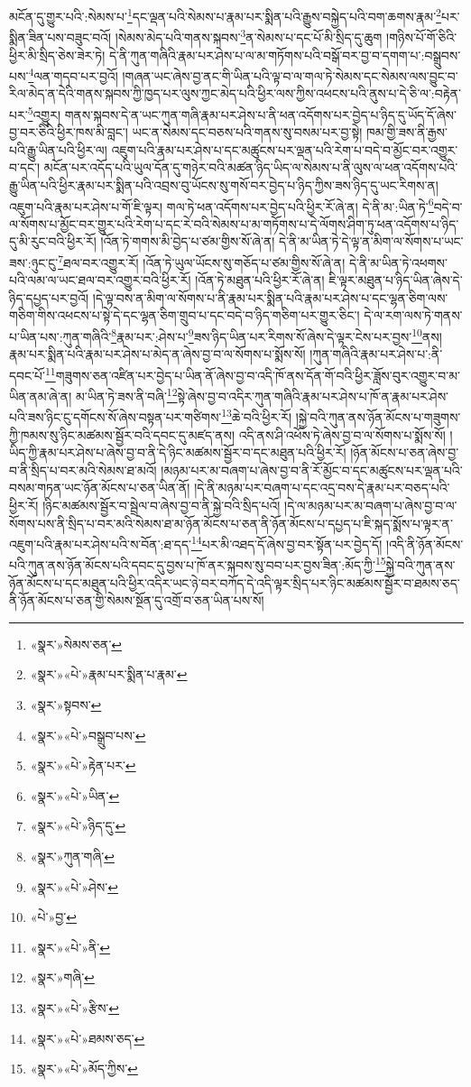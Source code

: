 མངོན་དུ་གྱུར་པའི་:སེམས་པ་\footnote{«སྣར་»སེམས་ཅན་}དང་ལྡན་པའི་སེམས་པ་རྣམ་པར་སྨིན་པའི་རྒྱུས་བསྐྱེད་པའི་བག་ཆགས་རྣམ་\footnote{«སྣར་»«པེ་»རྣམ་པར་སྨིན་པ་རྣམ་}པར་སྨིན་ཟིན་པས་བཟུང་བའོ། །སེམས་མེད་པའི་གནས་སྐབས་\footnote{«སྣར་»སྟབས་}ན་སེམས་པ་དང་པོ་མི་སྲིད་དུ་ཆུག །གཉིས་པོ་གོ་ཅིའི་ཕྱིར་མི་སྲིད་ཅེས་ཟེར་ཏེ། དེ་ནི་ཀུན་གཞིའི་རྣམ་པར་ཤེས་པ་ལ་མ་གཏོགས་པའི་བསྒོ་བར་བྱ་བ་དགག་པ་:བསྒྲུབས་པས་\footnote{«སྣར་»«པེ་»བསྒྲུབ་པས་}ལན་གདབ་པར་བྱའོ། །གཞན་ཡང་ཞེས་བྱ་ནང་གི་ཡིན་པའི་ལྟ་བ་ལ་གལ་ཏེ་སེམས་དང་སེམས་ལས་བྱུང་བ་རིལ་མེད་ན་དེའི་གནས་སྐབས་ཀྱི་ཁྱད་པར་ལུས་ཀྱང་མེད་པའི་ཕྱིར་ལས་ཀྱིས་འཕངས་པའི་ནུས་པ་དེ་ཅི་ལ་:བརྟེན་པར་\footnote{«སྣར་»«པེ་»རྟེན་པར་}འགྱུར། གནས་སྐབས་དེ་ན་ཡང་ཀུན་གཞི་རྣམ་པར་ཤེས་པ་ནི་ཕན་འདོགས་པར་བྱེད་པ་ཉིད་དུ་ཡོད་དོ་ཞེས་བྱ་བར་ཅིའི་ཕྱིར་ཁས་མི་བླང་། ཡང་ན་སེམས་དང་བཅས་པའི་གནས་སུ་བསམ་པར་བྱ་སྟེ། ཁམ་གྱི་ཟས་ནི་རྒྱས་པའི་རྒྱུ་ཡིན་པའི་ཕྱིར་ལ། འཇུག་པའི་རྣམ་པར་ཤེས་པ་དང་མཚུངས་པར་ལྡན་པའི་རེག་པ་བདེ་བ་མྱོང་བར་འགྱུར་བ་དང་། མངོན་པར་འདོད་པའི་ཡུལ་དོན་དུ་གཉེར་བའི་མཚན་ཉིད་ཡིད་ལ་སེམས་པ་ནི་ལུས་ལ་ཕན་འདོགས་པའི་རྒྱུ་ཡིན་པའི་ཕྱིར་རྣམ་པར་སྨིན་པའི་འབྲས་བུ་ཡོངས་སུ་གསོ་བར་བྱེད་པ་ཉིད་ཀྱིས་ཟས་ཉིད་དུ་ཡང་རིགས་ན། འཇུག་པའི་རྣམ་པར་ཤེས་པ་གོ་ཇི་ལྟར། གལ་ཏེ་ཕན་འདོགས་པར་བྱེད་པའི་ཕྱིར་རོ་ཞེ་ན། དེ་ནི་མ་:ཡིན་ཏེ་\footnote{«སྣར་»«པེ་»ཡིན་}བདེ་བ་ལ་སོགས་པ་མྱོང་བར་གྱུར་པའི་རེག་པ་དང་རེ་བའི་སེམས་པ་མ་གཏོགས་པ་དེ་ལོགས་ཤིག་ཏུ་ཕན་འདོགས་པ་ཉིད་དུ་མི་རུང་བའི་ཕྱིར་རོ། །འོན་ཏེ་གགས་མི་བྱེད་པ་ཙམ་གྱིས་སོ་ཞེ་ན། དེ་ནི་མ་ཡིན་ཏེ་དེ་ལྟ་ན་མིག་ལ་སོགས་པ་ཡང་ཟས་:ཉུང་ངུ་\footnote{«སྣར་»«པེ་»ཉིད་དུ་}ཐལ་བར་འགྱུར་རོ། །འོན་ཏེ་ཡུལ་ཡོངས་སུ་གཅོད་པ་ཙམ་གྱིས་སོ་ཞེ་ན། དེ་ནི་མ་ཡིན་ཏེ་འཕགས་པའི་ལམ་ལ་ཡང་ཐལ་བར་འགྱུར་བའི་ཕྱིར་རོ། །འོན་ཏེ་མཐུན་པའི་ཕྱིར་རོ་ཞེ་ན། ཇི་ལྟར་མཐུན་པ་ཉིད་ཡིན་ཞེས་དེ་ཉིད་དཔྱད་པར་བྱའོ། །དེ་ལྟ་བས་ན་མིག་ལ་སོགས་པ་ནི་རྣམ་པར་སྨིན་པའི་རྣམ་པར་ཤེས་པ་དང་ལྷན་ཅིག་ལས་གཅིག་གིས་འཕངས་པ་སྟེ་དེ་དང་ལྷན་ཅིག་གྲུབ་པ་དང་བདེ་བ་ཉིད་གཅིག་པར་གྱུར་ཅིང་། དེ་ལ་རག་ལས་ཏེ་གནས་པ་ཡིན་པས་:ཀུན་གཞིའི་\footnote{«སྣར་»ཀུན་གཞི་}རྣམ་པར་:ཤེས་པ་\footnote{«སྣར་»«པེ་»ཤེས་}ཟས་ཉིད་ཡིན་པར་རིགས་སོ་ཞེས་དེ་ལྟར་ངེས་པར་བྱས་\footnote{«པེ་»བྱ་}ནས། རྣམ་པར་སྨིན་པའི་རྣམ་པར་ཤེས་པ་མེད་ན་ཞེས་བྱ་བ་ལ་སོགས་པ་སྨོས་སོ། །ཀུན་གཞིའི་རྣམ་པར་ཤེས་པ་:ནི་དབང་པོ་\footnote{«སྣར་»«པེ་»ནི་}གཟུགས་ཅན་འཛིན་པར་བྱེད་པ་ཡིན་ནོ་ཞེས་བྱ་བ་འདི་ཁོ་ནས་དོན་གོ་བའི་ཕྱིར་ཟློས་བུར་འགྱུར་བ་མ་ཡིན་ནམ་ཞེ་ན། མ་ཡིན་ཏེ་ཟས་ནི་བཞི་\footnote{«སྣར་»གཞི་}སྟེ་ཞེས་བྱ་བ་འདིར་ཀུན་གཞིའི་རྣམ་པར་ཤེས་པ་ཁོ་ན་རྣམ་པར་ཤེས་པའི་ཟས་ཉིང་ངུ་དགོངས་སོ་ཞེས་བསྟན་པར་གཙིགས་\footnote{«སྣར་»«པེ་»རྩིས་}ཆེ་བའི་ཕྱིར་རོ། །སྐྱེ་བའི་ཀུན་ནས་ཉོན་མོངས་པ་གཟུགས་ཀྱི་ཁམས་སུ་ཉིང་མཚམས་སྦྱོར་བའི་དབང་དུ་མཛད་ནས། འདི་ནས་ཤི་འཕོས་ཏེ་ཞེས་བྱ་བ་ལ་སོགས་པ་སྨོས་སོ། །ཡིད་ཀྱི་རྣམ་པར་ཤེས་པ་ཞེས་བྱ་བ་ནི་དེ་ཉིང་མཚམས་སྦྱོར་བ་དང་མཐུན་པའི་ཕྱིར་རོ། །ཉོན་མོངས་པ་ཅན་ཞེས་བྱ་བ་ནི་སྲིད་པ་བར་མའི་སེམས་ཐ་མའོ། །མཉམ་པར་མ་བཞག་པ་ཞེས་བྱ་བ་ནི་རོ་མྱོང་བ་དང་མཚུངས་པར་ལྡན་པའི་བསམ་གཏན་ཡང་ཉོན་མོངས་པ་ཅན་ཡིན་ནོ། །དེ་ནི་མཉམ་པར་བཞག་པ་དང་འདྲ་བས་དེ་རྣམ་པར་བཅད་པའི་ཕྱིར་རོ། །ཉིང་མཚམས་སྦྱོར་བ་སྦྲེལ་བ་ཞེས་བྱ་བ་ནི་སྐྱེ་བའི་སྲིད་པའོ། །དེ་ལ་མཉམ་པར་མ་བཞག་པ་ཞེས་བྱ་བ་ལ་སོགས་པས་ནི་སྲིད་པ་བར་མའི་སེམས་ཐ་མ་ཉོན་མོངས་པ་ཅན་ནི་ཉོན་མོངས་པ་དཔྱད་པ་ཇི་སྐད་སྨོས་པ་ལྟར་ན་འཇུག་པའི་རྣམ་པར་ཤེས་པའི་ས་བོན་:ཐ་དད་\footnote{«སྣར་»«པེ་»ཐམས་ཅད་}པར་མི་འཐད་དོ་ཞེས་བྱ་བར་སྟོན་པར་བྱེད་དོ། །འདི་ནི་ཉོན་མོངས་པའི་ཀུན་ནས་ཉོན་མོངས་པའི་དབང་དུ་བྱས་པ་ཁོ་ནར་སྐབས་སུ་བབ་པར་བྱས་ཟིན་:མོད་ཀྱི་\footnote{«སྣར་»«པེ་»མོད་ཀྱིས་}སྐྱེ་བའི་ཀུན་ནས་ཉོན་མོངས་པ་དང་མཐུན་པའི་ཕྱིར་འདིར་ཡང་ཉེ་བར་བཀོད་དེ་འདི་ལྟར་སྲིད་པར་ཉིང་མཚམས་སྦྱོར་བ་ཐམས་ཅད་ནི་ཉོན་མོངས་པ་ཅན་གྱི་སེམས་སྔོན་དུ་འགྲོ་བ་ཅན་ཡིན་པས་སོ། 